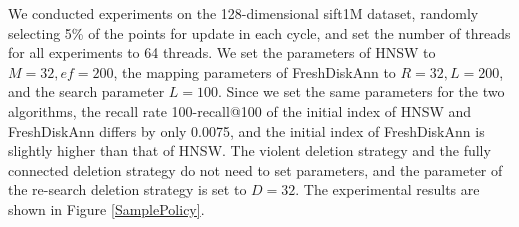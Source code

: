 We conducted experiments on the 128-dimensional sift1M dataset, randomly selecting 5\% of the points for update in each cycle, and set the number of threads for all experiments to 64 threads. We set the parameters of HNSW to $M=32, ef=200$, the mapping parameters of FreshDiskAnn to $R=32, L=200$, and the search parameter $L=100$. Since we set the same parameters for the two algorithms, the recall rate 100-recall@100 of the initial index of HNSW and FreshDiskAnn differs by only 0.0075, and the initial index of FreshDiskAnn is slightly higher than that of HNSW. The violent deletion strategy and the fully connected deletion strategy do not need to set parameters, and the parameter of the re-search deletion strategy is set to $D=32$. The experimental results are shown in Figure \ref{SamplePolicy}.

